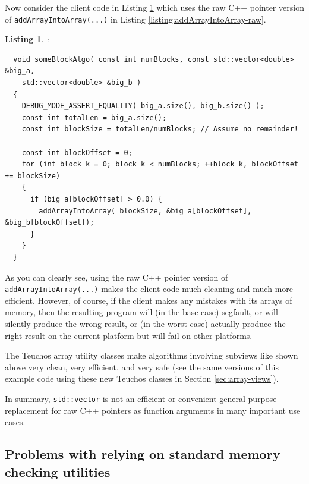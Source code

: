 \documentclass[pdf,ps2pdf,11pt]{SANDreport}
\newtheorem{listing}{Listing}
\begin{document}
Now consider the client code in Listing
{}\ref{listing:someBlockAlgo-std-vector-raw-ptr} which uses the raw C++
pointer version of {}\texttt{addArrayIntoArray(...)} in Listing
{}\ref{listing:addArrayIntoArray-raw}.

\begin{listing}:\\
\label{listing:someBlockAlgo-std-vector-raw-ptr}
{\small\begin{verbatim}
  void someBlockAlgo( const int numBlocks, const std::vector<double> &big_a,
    std::vector<double> &big_b )
  {
    DEBUG_MODE_ASSERT_EQUALITY( big_a.size(), big_b.size() );
    const int totalLen = big_a.size();
    const int blockSize = totalLen/numBlocks; // Assume no remainder!
    
    const int blockOffset = 0;
    for (int block_k = 0; block_k < numBlocks; ++block_k, blockOffset += blockSize)
    {
      if (big_a[blockOffset] > 0.0) {
        addArrayIntoArray( blockSize, &big_a[blockOffset], &big_b[blockOffset]);
      }
    }
  }
\end{verbatim}}
\end{listing}

As you can clearly see, using the raw C++ pointer version of
{}\texttt{addArrayIntoArray(...)} makes the client code much cleaning
and much more efficient.  However, of course, if the client makes any
mistakes with its arrays of memory, then the resulting program will
(in the base case) segfault, or will silently produce the wrong
result, or (in the worst case) actually produce the right result on
the current platform but will fail on other platforms.

The Teuchos array utility classes make algorithms involving subviews
like shown above very clean, very efficient, and very safe (see the
same versions of this example code using these new Teuchos classes in
Section {}\ref{sec:array-views}).

In summary, {}\texttt{std::vector} is {}\underline{not} an efficient
or convenient general-purpose replacement for raw C++ pointers as
function arguments in many important use cases.


%
{}\subsection{Problems with relying on standard memory checking
utilities}
\label{sec:problems-with-mem-checkers}
%
\end{document}
